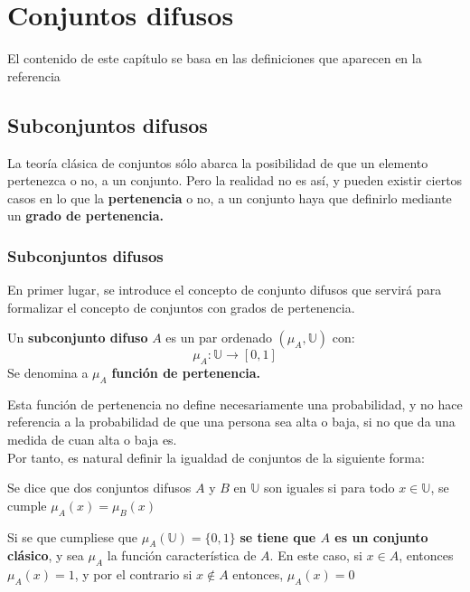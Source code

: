 
\chapter{Conjuntos difusos}
El contenido de este capítulo se basa en las definiciones que aparecen en la referencia \cite{fuzzyintro}

\section{Subconjuntos difusos}
La teoría clásica de conjuntos sólo abarca la posibilidad de que un elemento pertenezca o no, a un conjunto. Pero la realidad no es así, y pueden existir ciertos casos en lo que la \textbf{pertenencia} o no, a un conjunto haya que definirlo mediante un \textbf{grado de pertenencia.}

\subsection{Subconjuntos difusos}
En primer lugar, se introduce el concepto de conjunto difusos que servirá para formalizar el concepto de conjuntos con grados de pertenencia.

\begin{definicion}
	\label{def:subconjunto_difuso}
	
	Un \textbf{subconjunto difuso} $A$ es un par ordenado $(\mu_A, \mathbb{U})$ con:
	\[
		\mu_A : \mathbb{U} \longrightarrow [0,1]
	\]
	Se denomina a $\mu_A$ \textbf{función de pertenencia.}
\end{definicion}

Esta función de pertenencia no define necesariamente una probabilidad, y no hace referencia a la probabilidad de que una persona sea alta o baja, si no que da una medida de cuan alta o baja es.\\

Por tanto, es natural definir la igualdad de conjuntos de la siguiente forma:

\begin{definicion}
	\label{def:igualdad}
	Se dice que dos conjuntos difusos $A$ y $B$ en $\mathbb{U}$ son iguales si para todo $x \in \mathbb{U}$, se cumple $\mu_A(x) = \mu_B(x)$
\end{definicion}

Si se que cumpliese que $\mu_A(\mathbb{U})=\{0, 1\}$ \textbf{se tiene que $A$ es un conjunto clásico}, y sea $\mu_A$ la función característica de $A$. En este caso, si $x \in A$, entonces $\mu_A(x)=1$, y por el contrario si $x \notin A$ entonces, $\mu_A(x)=0$

